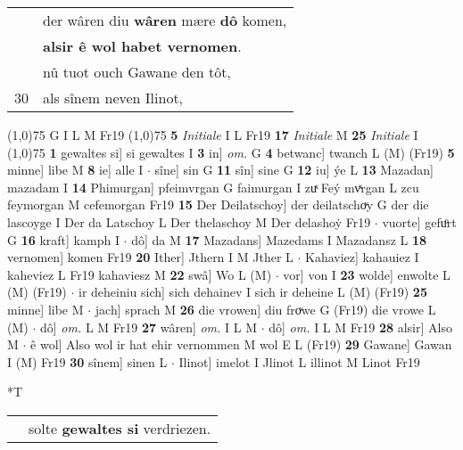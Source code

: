 \documentclass[8pt,a4paper,notitlepage]{article}
\begin{document}
\begin{table}[ht]
\begin{minipage}[t]{0.5\linewidth}
\begin{tabular}{rl}
 & der wâren diu \textbf{wâren} mære \textbf{dô} komen,\\ 
 & \textbf{alsir ê wol habet vernomen}.\\ 
 & nû tuot ouch Gawane den tôt,\\ 
30 & als sînem neven Ilinot,\\ 
\end{tabular}
\scriptsize
\line(1,0){75} \newline
G I L M Fr19 \newline
\line(1,0){75} \newline
\textbf{5} \textit{Initiale} I L Fr19  \textbf{17} \textit{Initiale} M  \textbf{25} \textit{Initiale} I  \newline
\line(1,0){75} \newline
\textbf{1} gewaltes si] si gewaltes I \textbf{3} in] \textit{om.} G \textbf{4} betwanc] twanch L (M) (Fr19) \textbf{5} minne] libe M \textbf{8} ie] alle I  $\cdot$ sîne] sin G \textbf{11} sîn] sine G \textbf{12} iu] ýe L \textbf{13} Mazadan] mazadam I \textbf{14} Phimurgan] pfeimvrgan G faimurgan I zuͯ Feý mvͯrgan L zcu feymorgan M cefemorgan Fr19 \textbf{15} Der Deilatschoy] der deilatschoͮy G der die lascoyge I Der da Latschoy L Der thelaschoy M Der delashoẏ Fr19  $\cdot$ vuorte] gefuͦrt G \textbf{16} kraft] kamph I  $\cdot$ dô] da M \textbf{17} Mazadans] Mazedams I Mazadansz L \textbf{18} vernomen] komen Fr19 \textbf{20} Ither] Jthern I M Jther L  $\cdot$ Kahaviez] kahauiez I kaheviez L Fr19 kahaviesz M \textbf{22} swâ] Wo L (M)  $\cdot$ vor] von I \textbf{23} wolde] enwolte L (M) (Fr19)  $\cdot$ ir deheiniu sich] sich dehainev I sich ir deheine L (M) (Fr19) \textbf{25} minne] libe M  $\cdot$ jach] sprach M \textbf{26} die vrowen] diu froͮwe G (Fr19) die vrowe L (M)  $\cdot$ dô] \textit{om.} L M Fr19 \textbf{27} wâren] \textit{om.} I L M  $\cdot$ dô] \textit{om.} I L M Fr19 \textbf{28} alsir] Also M  $\cdot$ ê wol] Also wol ir hat ehir vernommen M wol E L (Fr19) \textbf{29} Gawane] Gawan I (M) Fr19 \textbf{30} sînem] sinen L  $\cdot$ Ilinot] imelot I Jlinot L illinot M Linot Fr19 \newline
\end{minipage}
\hspace{0.5cm}
\begin{minipage}[t]{0.5\linewidth}
\small
\begin{center}*T
\end{center}
\begin{tabular}{rl}
 & solte \textbf{gewaltes si} verdriezen.\\ 

\end{tabular}
\end{minipage}
\end{table}
\end{document}

